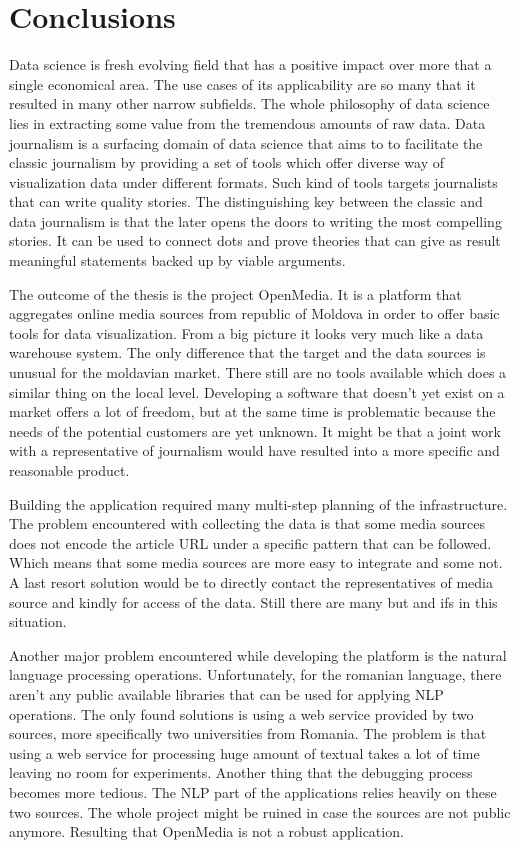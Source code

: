 \section*{Conclusions}
Data science is fresh evolving field that has a positive impact over more that a single economical area. The use cases of its applicability are so many that it resulted in many other narrow subfields. The whole philosophy of data science lies in extracting some value from the tremendous amounts of raw data. Data journalism is a surfacing domain of data science that aims to to facilitate the classic journalism by providing a set of tools which offer diverse way of visualization data under different formats. Such kind of tools targets journalists that can write quality stories. The distinguishing key between the classic and data journalism is that the later opens the doors to writing the most compelling stories. It can be used to connect dots and prove theories that can give as result meaningful statements backed up by viable arguments.

The outcome of the thesis is the project OpenMedia. It is a platform that aggregates online media sources from republic of Moldova in order to offer basic tools for data visualization. From a big picture it looks very much like a data warehouse system. The only difference that the target and the data sources is unusual for the moldavian market. There still are no tools available which does a similar thing on the local level. Developing a software that doesn't yet exist on a market offers a lot of freedom, but at the same time is problematic because the needs of the potential customers are yet unknown. It might be that a joint work with a representative of journalism would have resulted into a more specific and reasonable product.

Building the application required many multi-step planning of the infrastructure. The problem encountered with collecting the data is that some media sources does not encode the article URL under a specific pattern that can be followed. Which means that some media sources are more easy to integrate and some not. A last resort solution would be to directly contact the representatives of media source and kindly for access of the data. Still there are many but and ifs in this situation.

Another major problem encountered while developing the platform is the natural language processing operations. Unfortunately, for the romanian language, there aren't any public available libraries that can be used for applying NLP operations. The only found solutions is using a web service provided by two sources, more specifically two universities from Romania. The problem is that using a web service for processing huge amount of textual takes a lot of time leaving no room for experiments. Another thing that the debugging process becomes more tedious. The NLP part of the applications relies heavily on these two sources. The whole project might be ruined in case the sources are not public anymore. Resulting that OpenMedia is not a robust application.

